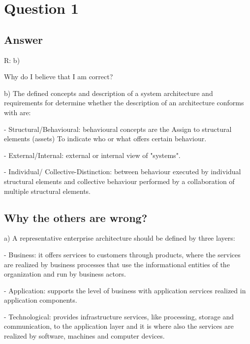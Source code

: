\documentclass[a4paper,12pt]{texDoc}
\begin{document}
\maketitle %


\section*{Question 1}

\subsection*{Answer}

R: b)

Why do I believe that I am correct?

b) The defined concepts and description of a system architecture and requirements for determine whether the description of an architecture conforms with are:

- Structural/Behavioural: behavioural concepts are the Assign to structural elements (assets) To indicate who or what offers certain behaviour.

- External/Internal: external or internal view of "systems".

- Individual/ Collective-Distinction: between behaviour executed by individual structural elements and collective behaviour performed by a collaboration of multiple structural elements.

\subsection*{Why the others are wrong?}

a) A representative enterprise architecture should be defined \cite{eaFundamentals} by three layers:

- Business: it offers services to customers through products, where the services are realized by business processes that use the informational entities of the organization and run by business actors.

- Application: supports the level of business with application services realized in application components.

- Technological: provides infrastructure services, like processing, storage and communication, to the application layer and it is where also the services are realized by software, machines and computer devices.
\end{document}
